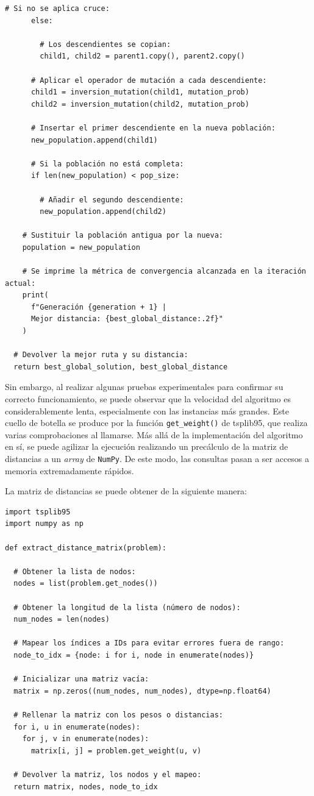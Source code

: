 \begin{lstlisting}[style=PythonStyle]
      # Si no se aplica cruce:
      else:

        # Los descendientes se copian:
        child1, child2 = parent1.copy(), parent2.copy()

      # Aplicar el operador de mutación a cada descendiente:
      child1 = inversion_mutation(child1, mutation_prob)
      child2 = inversion_mutation(child2, mutation_prob)

      # Insertar el primer descendiente en la nueva población:
      new_population.append(child1)

      # Si la población no está completa:
      if len(new_population) < pop_size:

        # Añadir el segundo descendiente:
        new_population.append(child2)

    # Sustituir la población antigua por la nueva:
    population = new_population

    # Se imprime la métrica de convergencia alcanzada en la iteración actual:
    print(
      f"Generación {generation + 1} | 
      Mejor distancia: {best_global_distance:.2f}"
    )

  # Devolver la mejor ruta y su distancia:
  return best_global_solution, best_global_distance
\end{lstlisting}

Sin embargo, al realizar algunas pruebas experimentales para confirmar su correcto funcionamiento, se puede observar que
la velocidad del algoritmo es considerablemente lenta, especialmente con las instancias más grandes. Este cuello de botella
se produce por la función \texttt{get\_weight()} de tsplib95, que realiza varias comprobaciones al llamarse. Más allá de la
implementación del algoritmo en sí, se puede agilizar la ejecución realizando un precálculo de la matriz de distancias a un
\textit{array} de \texttt{NumPy}. De este modo, las consultas pasan a ser accesos a memoria extremadamente rápidos.

La matriz de distancias se puede obtener de la siguiente manera:
\newline
\begin{lstlisting}[style=PythonStyle]
import tsplib95
import numpy as np

def extract_distance_matrix(problem):

  # Obtener la lista de nodos:
  nodes = list(problem.get_nodes())

  # Obtener la longitud de la lista (número de nodos):
  num_nodes = len(nodes)
  
  # Mapear los índices a IDs para evitar errores fuera de rango:
  node_to_idx = {node: i for i, node in enumerate(nodes)}
  
  # Inicializar una matriz vacía:
  matrix = np.zeros((num_nodes, num_nodes), dtype=np.float64)
  
  # Rellenar la matriz con los pesos o distancias:
  for i, u in enumerate(nodes):
    for j, v in enumerate(nodes):
      matrix[i, j] = problem.get_weight(u, v)
          
  # Devolver la matriz, los nodos y el mapeo:
  return matrix, nodes, node_to_idx
\end{lstlisting}

